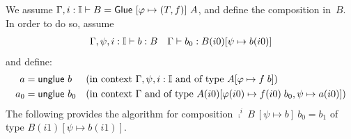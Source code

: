 We assume
$\Gamma, i : \mathbb{I} \vdash B = {\sf Glue}~[\varphi \mapsto (T,f{})]~A$, and
define the composition in~$B$. In order to do so, assume
\begin{align*}
  \Gamma,\psi,i : \II \der b : B %
  && %
  \Gamma\der b_0 :B(i0)[\psi\mapsto b(i0)]
\end{align*}
%
and define:
%
%
\begin{align*}
  a &= \ugl~ b %
  && (\text{in context }\Gamma, \psi, i : \II\text{ and of type }A[\varphi\mapsto \myeq{} \;  b])\\
  a_0 &= \ugl~ b_0 %
  && (\text{in context }\Gamma\text{ and of type }A(i0)[\varphi(i0)\mapsto \myeq{}(i0) \; b_0,\psi\mapsto a(i0)])
\end{align*}
%
The following provides the algorithm for composition
$\comp^i~B~[\psi\mapsto b]~b_0 = b_1$ of type $B(i1)[\psi \mapsto
b(i1)]$.
%
%

